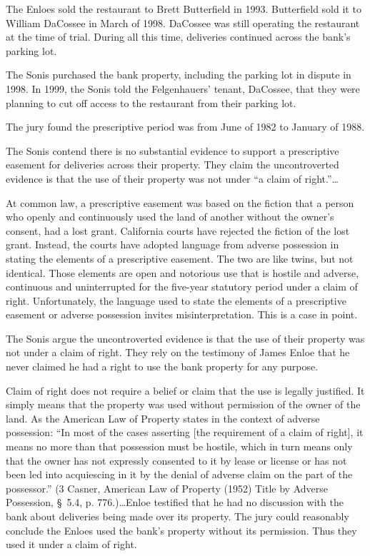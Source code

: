 The Enloes sold the restaurant to Brett Butterfield in 1993. Butterfield sold it
to William DaCossee in March of 1998. DaCossee was still operating the
restaurant at the time of trial. During all this time, deliveries continued
across the bank's parking lot.

The Sonis purchased the bank property, including the parking lot in dispute in
1998. In 1999, the Sonis told the Felgenhauers' tenant, DaCossee, that they were
planning to cut off access to the restaurant from their parking lot.

The jury found the prescriptive period was from June of 1982 to January of
1988.



The Sonis contend there is no substantial evidence to support a prescriptive
easement for deliveries across their property. They claim the uncontroverted
evidence is that the use of their property was not under ``a claim of
right.''\ldots

At common law, a prescriptive easement was based on the fiction that a person
who openly and continuously used the land of another without the owner's
consent, had a lost grant. California courts have rejected the fiction of the
lost grant. Instead, the courts have adopted language from adverse possession in
stating the elements of a prescriptive easement. The two are like twins, but not
identical. Those elements are open and notorious use that is hostile and
adverse, continuous and uninterrupted for the five-year statutory period under a
claim of right. Unfortunately, the language used to state the elements of a
prescriptive easement or adverse possession invites misinterpretation. This is a
case in point.

The Sonis argue the uncontroverted evidence is that the use of their property
was not under a claim of right. They rely on the testimony of James Enloe that
he never claimed he had a right to use the bank property for any purpose.

Claim of right does not require a belief or claim that the use is legally
justified. It simply means that the property was used without permission of the
owner of the land. As the American Law of Property states in the context of
adverse possession: ``In most of the cases asserting [the requirement of a claim
of right], it means no more than that possession must be hostile, which in turn
means only that the owner has not expressly consented to it by lease or license
or has not been led into acquiescing in it by the denial of adverse claim on the
part of the possessor.'' (3 Casner, American Law of Property (1952) Title by
Adverse Possession, \S~5.4, p. 776.)\dots Enloe testified that he had no
discussion with the bank about deliveries being made over its property. The jury
could reasonably conclude the Enloes used the bank's property without its
permission. Thus they used it under a claim of right.

